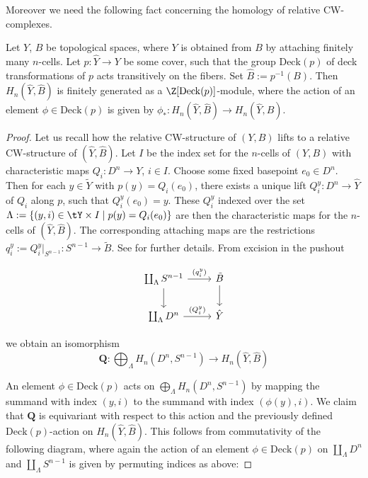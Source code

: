Moreover we need the following fact concerning the homology of relative CW-complexes.

\begin{lemma}
    \label{appendix2:lem:finite_generated_homology}
Let $Y$, $B$ be topological spaces, where $Y$ is obtained from $B$ by attaching finitely many $n$-cells. Let $p \colon \hat{Y} \to Y$ be some cover, such that the group $\mathrm{Deck}(p)$ of deck transformations of $p$ acts transitively on the fibers. Set $\hat{B} := p^{-1}(B)$. Then $H_n(\hat{Y},\hat{B})$ is finitely generated as a $\Z[\mathrm{Deck}(p)]$-module, where the action of an element $\phi \in \mathrm{Deck}(p)$ is given by $\phi_\ast \colon H_n(\hat{Y},\hat{B}) \to H_n(\hat{Y},\hat{B})$.
\end{lemma}

\begin{proof}
Let us recall how the relative CW-structure of $(Y,B)$ lifts to a relative CW-structure of $(\hat{Y},\hat{B})$. Let $I$ be the index set for the $n$-cells of $(Y,B)$ with characteristic maps $Q_i \colon D^n \to Y$, $i \in I$. Choose some fixed basepoint $e_0 \in D^n$. Then for each $y \in \tilde{Y}$ with $p(y) = Q_i(e_0)$, there exists a unique lift $Q_i^y \colon D^n \to \hat{Y}$ of $Q_i$ along $p$, such that $Q_i^y(e_0) = y$. These $Q_i^y$ indexed over the set
\(    \Lambda := \{(y,i) \in \tY \times I \mid p(y) = Q_i(e_0)\}
   \)
are then the characteristic maps for the $n$-cells of $(\hat{Y},\hat{B})$. The corresponding attaching maps are the restrictions
\(    q_i^y := Q_i^y|_{S^{n-1}} \colon S^{n-1} \to \tilde{B}.
   \)
See \cite[Theorem 1.1.6]{fritsch1990cellular} for further details. From excision in the pushout

\[\begin{tikzcd}
{\coprod_{\Lambda}S^{n-1}} & {\tilde{B}} \\
{\coprod_{\Lambda}D^n} & {\hat{Y}}
\arrow["{(q_i^y)}", from=1-1, to=1-2]
\arrow[from=1-1, to=2-1]
\arrow[from=1-2, to=2-2]
\arrow["{(Q_i^y)}", from=2-1, to=2-2]
\end{tikzcd}\]

\noindent we obtain an isomorphism
\[
\bm{Q} \colon \bigoplus_{\Lambda} H_n(D^n,S^{n-1}) \to H_n(\hat{Y},\hat{B})
\]

An element $\phi \in \mathrm{Deck}(p)$ acts on $\bigoplus_{\Lambda} H_n(D^n,S^{n-1})$ by mapping the summand with index $(y,i)$ to the summand with index $(\phi(y),i)$. We claim that $\bm{Q}$ is equivariant with respect to this action and the previously defined $\mathrm{Deck}(p)$-action on $H_n(\hat{Y},\hat{B})$. This follows from commutativity of the following diagram, where again the action of an element $\phi \in \mathrm{Deck}(p)$ on $\coprod_{\Lambda} D^n$ and $\coprod_{\Lambda} S^{n-1}$ is given by permuting indices as above:


\end{proof}
